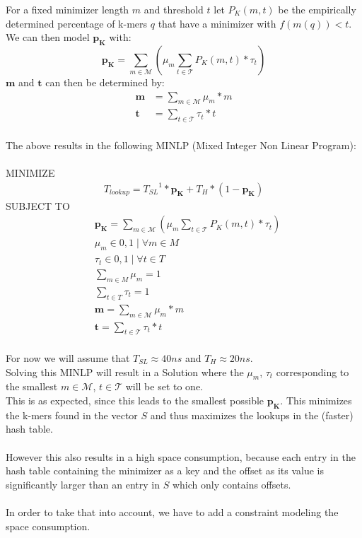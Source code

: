 \documentclass{article}
\newcommand{\lookupTime}{T_{lookup}}
\newcommand{\timeForLookupInS}{{T_{SL}}}
\newcommand{\timeForHashtable}{{T_H}}
\newcommand{\percKmers}{\textbf{p}_\textbf{K}}
\newcommand{\percKmersEmpiric}{P_{K}}
\newcommand{\possibleMinimizerLength}{\mathcal{M}}
\newcommand{\possibleThresholds}{\mathcal{T}}
\newcommand{\minimizerLength}{\textbf{m}}
\newcommand{\threshold}{\textbf{t}}
\newcommand{\selectorm}{\mu}
\newcommand{\selectort}{\tau}
\newcommand{\levelOne}{1}
\begin{document}
For a fixed minimizer length $m$ and threshold $t$ let $\percKmersEmpiric(m, t)$ be the empirically determined percentage of k-mers $q$ that have a minimizer with $f(m(q)) < t$.\\
We can then model $\percKmers$ with:
\[ \percKmers = \sum_{m \in \possibleMinimizerLength} \left( \selectorm_m \sum_{t \in \possibleThresholds} \percKmersEmpiric(m, t) * \selectort_t\right) \]
$\minimizerLength$ and $\threshold$ can then be determined by:
\begin{align*}
	\minimizerLength &= \sum_{m \in \possibleMinimizerLength} \selectorm_m * m \\
	\threshold &= \sum_{t \in \possibleThresholds} \selectort_t * t
\end{align*}
\\
The above results in the following MINLP (Mixed Integer Non Linear Program):\\
\\
MINIMIZE
\begin{align*}
	\lookupTime = \timeForLookupInS^\levelOne * \percKmers + \timeForHashtable * (1-\percKmers)
\end{align*}
SUBJECT TO
\begin{align*}
		&\percKmers = \sum_{m \in \possibleMinimizerLength} \left( \selectorm_m \sum_{t \in \possibleThresholds} \percKmersEmpiric(m, t) * \selectort_t\right)\\
		&\selectorm_m \in {0,1} \mid \forall m \in M \\
		&\selectort_t \in {0,1} \mid \forall t \in T \\
		&\sum_{m \in M} \selectorm_m = 1 \\
		&\sum_{t \in T} \selectort_t = 1 \\
		&\minimizerLength = \sum_{m \in \possibleMinimizerLength} \selectorm_m * m \\
		&\threshold = \sum_{t \in \possibleThresholds} \selectort_t * t
\end{align*}
\\
For now we will assume that $\timeForLookupInS \approx 40ns$ and $\timeForHashtable \approx 20ns$.\\
Solving this MINLP will result in a Solution where the $\selectorm_m$, $\selectort_t$ corresponding to the smallest $m \in \possibleMinimizerLength$, $t \in \possibleThresholds$ will be set to one.\\
This is as expected, since this leads to the smallest possible $\percKmers$. This minimizes the k-mers found in the vector $S$ and thus maximizes the lookups in the (faster) hash table.\\
\\
However this also results in a high space consumption, because each entry in the hash table containing the minimizer as a key and the offset as its value is significantly larger than an entry in $S$ which only contains offsets.\\
\\
In order to take that into account, we have to add a constraint modeling the space consumption.\\
\end{document}
